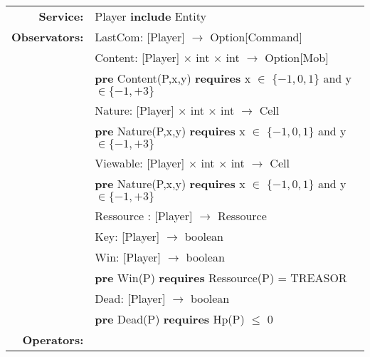 \begin{tabular}{rl}

\textbf{Service:}& \quad Player \textbf{include} Entity\\
\textbf{Observators:} &
\quad LastCom: [Player] $\rightarrow$ Option[Command]\\
& \quad Content: [Player] $\times$ int $\times$ int $\rightarrow$ Option[Mob]\\
& 
\textbf{pre} Content(P,x,y) \textbf{requires} x $\in$ $\{-1,0,1\}$ and y $\in \{-1,+3\}$\\
& \quad Nature: [Player] $\times$ int $\times$ int $\rightarrow$ Cell\\
& \textbf{pre} Nature(P,x,y) \textbf{requires} x $\in$ $\{-1,0,1\}$ and y $\in \{-1,+3\}$\\
& \quad Viewable: [Player] $\times$ int $\times$ int $\rightarrow$ Cell\\

& \textbf{pre} Nature(P,x,y) \textbf{requires} x $\in$ $\{-1,0,1\}$ and y $\in \{-1,+3\}$\\
& \quad Ressource : [Player] $\rightarrow$ Ressource\\
& \quad Key: [Player] $\rightarrow$ boolean\\
& \quad Win: [Player] $\rightarrow$ boolean\\
& \textbf{pre} Win(P) \textbf{requires}  Ressource(P) = TREASOR\\
& \quad Dead: [Player] $\rightarrow$ boolean\\
& \textbf{pre} Dead(P) \textbf{requires} Hp(P) $\leq$ 0\\

\textbf{Operators:}
\end{tabular}

